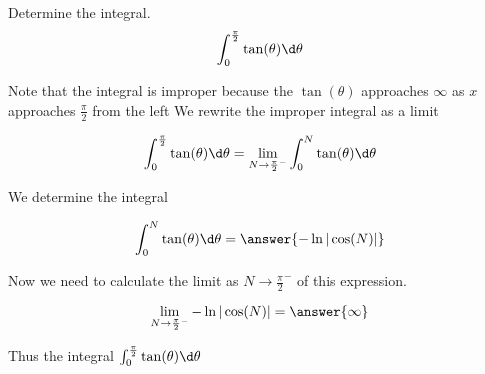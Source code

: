 \documentclass{ximera}
\author{Jason Miller}
\begin{document}
\begin{exercise}
Determine the integral.
\[
\int_{0}^{\frac{\pi}{2}} \tan(\theta) \d \theta 
\]

Note that the integral is improper because the $\tan(\theta)$ approaches $\infty$ as $x$ approaches $\frac{\pi}{2}$ from the left
We  rewrite the improper integral as a limit

\[
\int_{0}^{\frac{\pi}{2}} \tan(\theta) \d \theta=\lim_{N \to {\frac{\pi}{2}}^{-}} \int_{0}^{N} \tan(\theta) \d \theta
\]

We determine the integral

\[
\int_{0}^{N} \tan(\theta) \d \theta= \answer{-\ln|\cos(N)| }
\]


\begin{exercise}
Now we need to calculate the limit as $N \to {\frac{\pi}{2}}^{-}$ of this expression. 

\[
\lim_{N \to {\frac{\pi}{2}}^{-}} -\ln| \cos(N) |= \answer{  \infty }
\]

\begin{exercise}
Thus the integral $\int_{0}^{\frac{\pi}{2}} \tan(\theta) \d \theta$ 

\begin{multipleChoice}
\end{multipleChoice}




\end{exercise}
\end{exercise}
\end{exercise}
\end{document}
